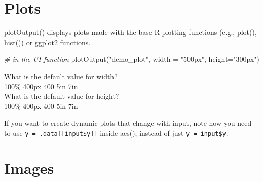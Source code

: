 \documentclass[
]{book}
\newenvironment{Shaded}{\begin{snugshade}}{\end{snugshade}}
\newcommand{\AttributeTok}[1]{\textcolor[rgb]{0.77,0.63,0.00}{#1}}
\newcommand{\CommentTok}[1]{\textcolor[rgb]{0.56,0.35,0.01}{\textit{#1}}}
\newcommand{\ConstantTok}[1]{\textcolor[rgb]{0.00,0.00,0.00}{#1}}
\newcommand{\FunctionTok}[1]{\textcolor[rgb]{0.00,0.00,0.00}{#1}}
\newcommand{\NormalTok}[1]{#1}
\newcommand{\OtherTok}[1]{\textcolor[rgb]{0.56,0.35,0.01}{#1}}
\newcommand{\SpecialCharTok}[1]{\textcolor[rgb]{0.00,0.00,0.00}{#1}}
\newcommand{\StringTok}[1]{\textcolor[rgb]{0.31,0.60,0.02}{#1}}
\begin{document}
\hypertarget{plots}{%
\section{Plots}\label{plots}}

plotOutput() displays plots made with the base R plotting functions (e.g., plot(), hist()) or ggplot2 functions.

\begin{Shaded}
\begin{Highlighting}[]
\CommentTok{\# in the UI function}
\FunctionTok{plotOutput}\NormalTok{(}\StringTok{"demo\_plot"}\NormalTok{, }\AttributeTok{width =} \StringTok{"500px"}\NormalTok{, }\AttributeTok{height=}\StringTok{"300px"}\NormalTok{)}
\end{Highlighting}
\end{Shaded}

What is the default value for width?\\
100\% 400px 400 5in 7in\\
What is the default value for height?\\
100\% 400px 400 5in 7in

\begin{Shaded}
\end{Shaded}

If you want to create dynamic plots that change with input, note how you need to use \texttt{y\ =\ .data{[}{[}input\$y{]}{]}} inside aes(), instead of just \texttt{y\ =\ input\$y}.

\hypertarget{images}{%
\section{Images}\label{images}}
\end{document}
